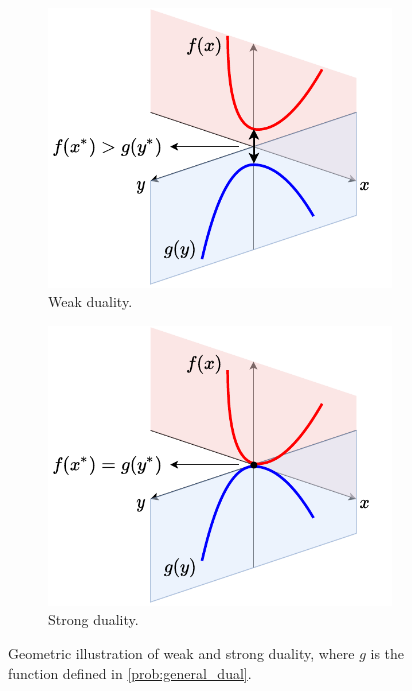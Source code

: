 \begin{figure}[t] 
    \begin{subfigure}{.48\textwidth}
      \centering
      \includegraphics[width=\linewidth]{./figures/weak_dual.pdf}
      \captionsetup{justification=centering}
      \caption{Weak duality.}
    \end{subfigure}
    \hfill
    \begin{subfigure}{.48\textwidth}
      \centering
      \includegraphics[width=\linewidth]{./figures/strong_dual.pdf}
      \captionsetup{justification=centering}
      \caption{Strong duality.}
    \end{subfigure}
    \captionsetup{justification=centering}
    \caption{Geometric illustration of weak and strong duality, where $g$ is the function defined in \eqref{prob:general_dual}.}
    \label{fig:duality}
\end{figure}

